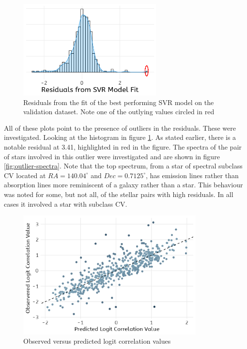 \documentclass[preprint, 3p,
authoryear]{elsarticle} %
\begin{document}
\begin{figure}
  \centering
  \includegraphics[width=\columnwidth, height = 5cm, width = 10cm]{figures/histogram}
    \caption{Residuals from the fit of the best performing SVR model on the validation dataset. Note one of the outlying values circled in red}
    \label{fig:histogram-residuals}
\end{figure}

All of these plots point to the presence of outliers in the residuals.
These were investigated. Looking at the histogram in figure
\ref{fig:histogram-residuals}. As stated earlier, there is a notable
residual at 3.41, highlighted in red in the figure. The spectra of the
pair of stars involved in this outlier were investigated and are shown
in figure \ref{fig:outlier-spectra}. Note that the top spectrum, from a
star of spectral subclass CV located at \(RA = 140.04^{\circ}\) and
\(Dec = 0.7125^{\circ}\), has emission lines rather than absorption
lines more reminiscent of a galaxy rather than a star. This behaviour
was noted for some, but not all, of the stellar pairs with high
residuals. In all cases it involved a star with subclass CV.

\begin{figure}
\centering
  \includegraphics[width=\columnwidth, height = 6.5cm, width = 10cm]{figures/observed-predicted}
    \caption{Observed versus predicted logit correlation values}
    \label{fig:obs-pred}
\end{figure}
\end{document}

